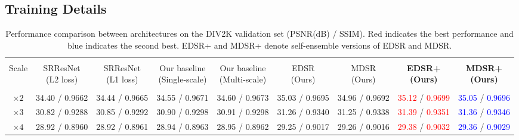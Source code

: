 \documentclass[10pt,twocolumn,letterpaper]{article}
\begin{document}
	\subsection{Training Details} 
	\label{sec_training_details}
	
\begin{table*}[h]
		{\scriptsize
			\renewcommand{\arraystretch}{1.4}
			\newcommand{\colWidth}{1.6cm}
			\setlength\tabcolsep{0.1cm}
			\begin{center}
				\begin{tabular}{ |c|c|c|c|c|c|c|c|c| }
					\hline &&&&&&&& \\ [-1em]
Scale & \parbox[c]{\colWidth}{\centering SRResNet\\ (L2 loss)}
					& \parbox[c]{\colWidth}{\centering SRResNet\\ (L1 loss)}
					& \parbox[c]{\colWidth}{\centering Our baseline\\ (Single-scale)}
					& \parbox[c]{\colWidth}{\centering Our baseline\\ (Multi-scale)} 
					& \parbox[c]{1.5cm}{\centering EDSR\\ (Ours)}
					& \parbox[c]{1.5cm}{\centering MDSR\\ (Ours)}
					& \parbox[c]{1.5cm}{\centering\textbf{EDSR+\\ (Ours)}} 
					& \parbox[c]{1.5cm}{\centering\textbf{MDSR+\\ (Ours)}} \\ 
					&&&&&&&& \\ [-1em]\hline
					$\times 2$ &
					34.40 / 0.9662 &
					34.44 / 0.9665 &
					34.55 / 0.9671 &
					34.60 / 0.9673 &
					35.03 / 0.9695 &	
					34.96 / 0.9692 &
					\textcolor{red}{35.12} / \textcolor{red}{0.9699} &
					\textcolor{blue}{35.05} / \textcolor{blue}{0.9696} \\
					$\times 3$ &
					30.82 / 0.9288 &
					30.85 / 0.9292 &
					30.90 / 0.9298 &
					30.91 / 0.9298 &
					31.26 / 0.9340 &	
					31.25 / 0.9338 &
					\textcolor{red}{31.39} / \textcolor{red}{0.9351} &
					\textcolor{blue}{31.36} / \textcolor{blue}{0.9346} \\
					$\times 4$ &
					28.92 / 0.8960 &
					28.92 / 0.8961 &
					28.94 / 0.8963 &
					28.95 / 0.8962 &
					29.25 / 0.9017 &
					29.26 / 0.9016 &
					\textcolor{red}{29.38} / \textcolor{red}{0.9032} &
					\textcolor{blue}{29.36} / \textcolor{blue}{0.9029} \\
					\hline
				\end{tabular}
			\end{center}
		}
		\captionsetup{justification=raggedright,singlelinecheck=false}
		\caption{Performance comparison between architectures on the DIV2K validation set (PSNR(dB) / SSIM). Red indicates the best performance and blue indicates the second best. EDSR+ and MDSR+ denote self-ensemble versions of EDSR and MDSR.}
		\label{table_div2k_300k}
	\end{table*}
	
\end{document}
